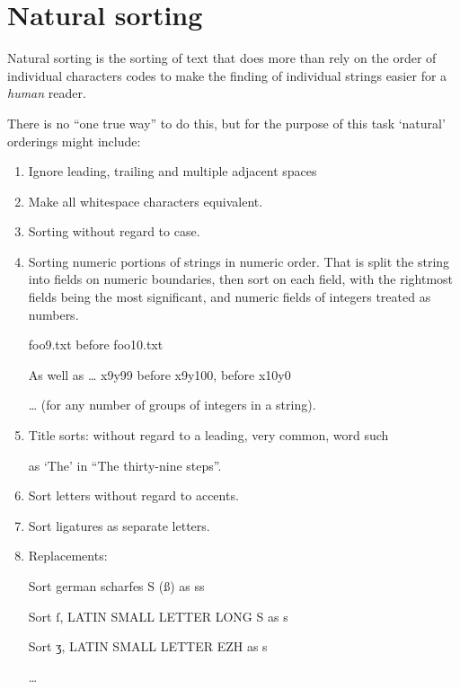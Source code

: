 \pagebreak{}
\section*{Natural sorting}

Natural sorting is the sorting of text that does more than rely on the
order of individual characters codes to make the finding of individual
strings easier for a \emph{human} reader.

There is no ``one true way'' to do this, but for the purpose of this
task `natural' orderings might include:

\begin{enumerate}
\item Ignore leading, trailing and multiple adjacent spaces

\item Make all whitespace characters equivalent.

\item Sorting without regard to case.

\item Sorting numeric portions of strings in numeric order. That is split
the string into fields on numeric boundaries, then sort on each field,
with the rightmost fields being the most significant, and numeric fields
of integers treated as numbers.

foo9.txt before foo10.txt

As well as \ldots{} x9y99 before x9y100, before x10y0

\ldots{} (for any number of groups of integers in a string).

\item Title sorts: without regard to a leading, very common, word such

as `The' in ``The thirty-nine steps''.

\item Sort letters without regard to accents.

\item Sort ligatures as separate letters.

\item Replacements:

Sort german scharfes S (ß) as ss

Sort ſ, LATIN SMALL LETTER LONG S as s

Sort ʒ, LATIN SMALL LETTER EZH as s

\ldots{}

\end{enumerate}

